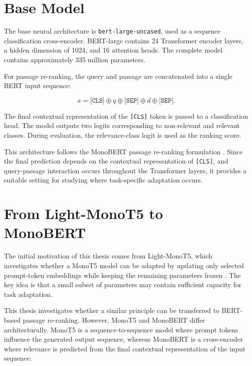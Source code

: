 \section{Base Model}
\label{sec:methodology_base_model}

The base neural architecture is \texttt{bert-large-uncased}, used as a sequence classification cross-encoder. BERT-large contains 24 Transformer encoder layers, a hidden dimension of 1024, and 16 attention heads. The complete model contains approximately 335 million parameters.

For passage re-ranking, the query and passage are concatenated into a single BERT input sequence:

\begin{equation}
    x = \texttt{[CLS]} \oplus q \oplus \texttt{[SEP]} \oplus d \oplus \texttt{[SEP]}.
\end{equation}

The final contextual representation of the \texttt{[CLS]} token is passed to a classification head. The model outputs two logits corresponding to non-relevant and relevant classes. During evaluation, the relevance-class logit is used as the ranking score.

This architecture follows the MonoBERT passage re-ranking formulation \cite{nogueira2019passage}. Since the final prediction depends on the contextual representation of \texttt{[CLS]}, and query-passage interaction occurs throughout the Transformer layers, it provides a suitable setting for studying where task-specific adaptation occurs.

\section{From Light-MonoT5 to MonoBERT}
\label{sec:methodology_light_monot5_transfer}

The initial motivation of this thesis comes from Light-MonoT5, which investigates whether a MonoT5 model can be adapted by updating only selected prompt-token embeddings while keeping the remaining parameters frozen \cite{braga2025monot5}. The key idea is that a small subset of parameters may contain sufficient capacity for task adaptation.

This thesis investigates whether a similar principle can be transferred to BERT-based passage re-ranking. However, MonoT5 and MonoBERT differ architecturally. MonoT5 is a sequence-to-sequence model where prompt tokens influence the generated output sequence, whereas MonoBERT is a cross-encoder where relevance is predicted from the final contextual representation of the input sequence.

